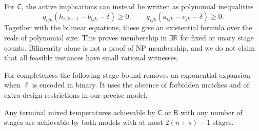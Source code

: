 \documentclass[11pt,a4paper]{report}
\newcommand{\CC}{\mathsf{C}}
\newcommand{\BB}{\mathsf{B}}
\newcommand{\ER}{\exists\mathbb{R}}
\begin{document}
For $\CC$, the active implications can instead be written as polynomial
inequalities
\begin{equation}
 q_{ijk}(h_{i,k-1}-b_{ijk}-\delta)\geq0,\qquad
 q_{ijk}(a_{ijk}-c_{jk}-\delta)\geq0.
\end{equation}
Together with the bilinear equations, these give an existential formula over
the reals of polynomial size. This proves membership in $\ER$ for fixed or
unary stage counts. Bilinearity alone is not a proof of NP membership, and
we do not claim that all feasible instances have small rational witnesses.

For completeness the following stage bound removes an exponential expansion
when $\ell$ is encoded in binary. It uses the absence of forbidden matches
and of extra design restrictions in our precise model.
\begin{lemma}[note=Compression of the number of stages]\label{lem:compress}
Any terminal mixed temperatures achievable by $\CC$ or $\BB$ with any number
of stages are achievable by both models with at most $2(n+s)-1$ stages.
\end{lemma}
\end{document}
